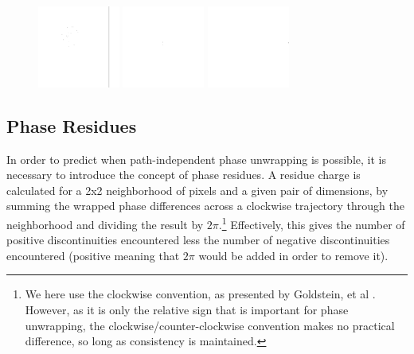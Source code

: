 \begin{figure}[h]
\center

\includegraphics[width=0.24\textwidth]{images/2/00c_noise_wrapped.png}
\includegraphics[width=0.24\textwidth]{images/3/01a_noise_xy.png}
\includegraphics[width=0.24\textwidth]{images/3/01b_noise_yx.png}

\label{fig:Itoh}
\end{figure}

\subsection{Phase Residues}

In order to predict when path-independent phase unwrapping is possible, it is necessary to introduce the concept of phase residues.  A residue charge is calculated for a 2x2 neighborhood of pixels and a given pair of dimensions, by summing the wrapped phase differences across a clockwise trajectory through the neighborhood and dividing the result by $2\pi$.\footnote{We here use the clockwise convention, as presented by Goldstein, et al \cite{Goldstein1988}.  However, as it is only the relative sign that is important for phase unwrapping, the clockwise/counter-clockwise convention makes no practical difference, so long as consistency is maintained.}  Effectively, this gives the number of positive discontinuities encountered less the number of negative discontinuities encountered (positive meaning that $2\pi$ would be added in order to remove it).

